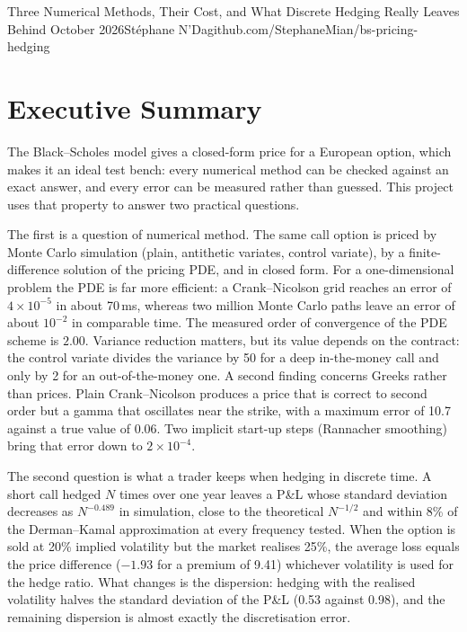 \documentclass[11pt,a4paper,oneside]{report}
\begin{document}
{Three Numerical Methods, Their Cost, and What Discrete Hedging Really Leaves Behind}
{October 2026}{Stéphane N'Da}{github.com/StephaneMian/bs-pricing-hedging}

\chapter*{Executive Summary}
\thispagestyle{plain}

The Black--Scholes model gives a closed-form price for a European option, which makes it an ideal test bench: every numerical method can be checked against an exact answer, and every error can be measured rather than guessed. This project uses that property to answer two practical questions.

The first is a question of numerical method. The same call option is priced by Monte Carlo simulation (plain, antithetic variates, control variate), by a finite-difference solution of the pricing PDE, and in closed form. For a one-dimensional problem the PDE is far more efficient: a Crank--Nicolson grid reaches an error of $4\times10^{-5}$ in about 70\,ms, whereas two million Monte Carlo paths leave an error of about $10^{-2}$ in comparable time. The measured order of convergence of the PDE scheme is $2.00$. Variance reduction matters, but its value depends on the contract: the control variate divides the variance by 50 for a deep in-the-money call and only by 2 for an out-of-the-money one. A second finding concerns Greeks rather than prices. Plain Crank--Nicolson produces a price that is correct to second order but a gamma that oscillates near the strike, with a maximum error of 10.7 against a true value of 0.06. Two implicit start-up steps (Rannacher smoothing) bring that error down to $2\times10^{-4}$.

The second question is what a trader keeps when hedging in discrete time. A short call hedged $N$ times over one year leaves a P\&L whose standard deviation decreases as $N^{-0.489}$ in simulation, close to the theoretical $N^{-1/2}$ and within 8\% of the Derman--Kamal approximation at every frequency tested. When the option is sold at 20\% implied volatility but the market realises 25\%, the average loss equals the price difference ($-1.93$ for a premium of 9.41) whichever volatility is used for the hedge ratio. What changes is the dispersion: hedging with the realised volatility halves the standard deviation of the P\&L (0.53 against 0.98), and the remaining dispersion is almost exactly the discretisation error.
\end{document}
